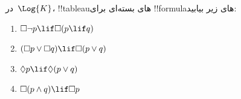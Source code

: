 \documentclass[../../../include/open-logic-section]{subfiles}
\begin{document}
\begin{prob}
  در~$\Log{K}$، !!{tableau}های بسته‌ای برای !!{formula}های زیر بیابید:
  \begin{enumerate}
    \item $\Box \lnot p \lif \Box(p \lif q)$
    \item $(\Box p \lor \Box q) \lif \Box(p \lor q)$
    \item $\Diamond p \lif \Diamond(p \lor q)$
    \item $\Box(p \land q) \lif \Box p$
  \end{enumerate}
\end{prob}
\end{document}
